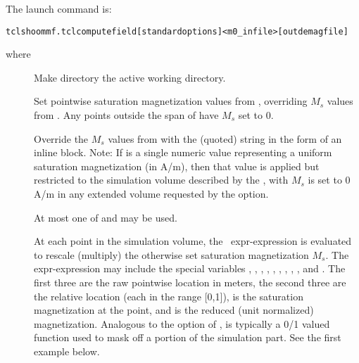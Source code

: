 The  launch command is:
\begin{alltt}
tclsh oommf.tcl computefield [standard options]       <m0_infile> [outdemagfile]
\end{alltt}
where
\begin{description}
\item[]
  Make directory the active working directory.
\item[]
  Set pointwise saturation magnetization values from
  , overriding $M_s$ values from .  Any
  points outside the span of  have $M_s$ set to 0.
\item[]
  Override the $M_s$ values from  with the (quoted)
   string in the form of an inline
  block. Note: If  is a single numeric value representing a
  uniform saturation magnetization (in A/m), then that value is
  applied but restricted to the simulation volume described by the
  , with $M_s$ is set to 0 A/m in any extended volume
  requested by the  option.

  At most one of  and  may be used.

\item[]
  At each point in the simulation volume, the \Tcl\ expr-expression
   is evaluated to rescale (multiply) the otherwise set
  saturation magnetization $M_s$. The expr-expression may include the
  special variables , , , , ,
  , , , , and . The first
  three are the raw pointwise location in meters, the second three are
  the relative location (each in the range [0,1]),  is the
  saturation magnetization at the point, and  is
  the reduced (unit normalized) magnetization. Analogous to the
   option of ,  is typically a 0/1 valued
  function used to mask off a portion of the simulation part. See the
  first example below.


\end{description}
